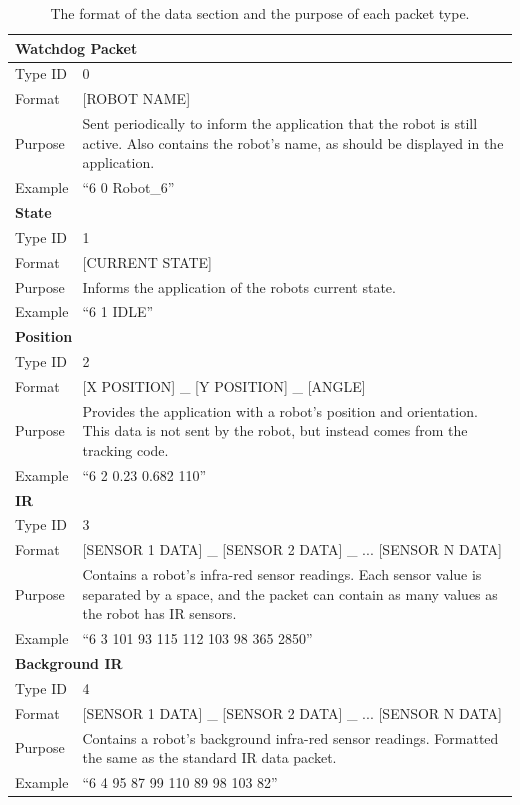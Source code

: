 \clearpage
\begin{longtable}{ l p{12cm} }
\caption[Data Format]{The format of the data section and the purpose of each packet type.}\\
 \hline
 \multicolumn{2}{p{12cm}}{\textbf{Watchdog Packet}}\\
 \hline
 Type ID & 0 \\
 Format & [ROBOT NAME]\\
 Purpose & Sent periodically to inform the application that the robot is still active. Also contains the robot's name, as should be displayed in the application.\\
 Example & ``6 0 Robot\_6''\\
 
 \hline
 \multicolumn{2}{p{12cm}}{\textbf{State}}\\
 \hline
 Type ID & 1 \\
 Format & [CURRENT STATE]\\
 Purpose & Informs the application of the robots current state.\\
 Example & ``6 1 IDLE''\\
 
 \hline
 \multicolumn{2}{p{12cm}}{\textbf{Position}}\\
 \hline
 Type ID & 2 \\
 Format & [X POSITION] \_ [Y POSITION] \_ [ANGLE]\\
 Purpose & Provides the application with a robot's position and orientation. This data is not sent by the robot, but instead comes from the tracking code.\\
 Example & ``6 2 0.23 0.682 110''\\
 
 \hline
 \multicolumn{2}{p{12cm}}{\textbf{IR}}\\
 \hline
 Type ID & 3 \\
 Format & [SENSOR 1 DATA] \_ [SENSOR 2 DATA] \_ ... [SENSOR N DATA] \\
 Purpose & Contains a robot's infra-red sensor readings. Each sensor value is separated by a space, and the packet can contain as many values as the robot has IR sensors. \\
 Example & ``6 3 101 93 115 112 103 98 365 2850''\\
 
 \hline
 \multicolumn{2}{p{12cm}}{\textbf{Background IR}}\\
 \hline
 Type ID & 4 \\
 Format & [SENSOR 1 DATA] \_ [SENSOR 2 DATA] \_ ... [SENSOR N DATA] \\
 Purpose & Contains a robot's background infra-red sensor readings. Formatted the same as the standard IR data packet.\\
 Example & ``6 4 95 87 99 110 89 98 103 82''\\
 

\end{longtable}
